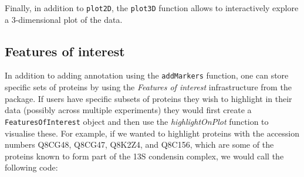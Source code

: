 Finally, in addition to \texttt{plot2D}, the \texttt{plot3D} function
allows to interactively explore a 3-dimensional plot of the data.

\pagebreak

\subsection*{Features of interest}
In addition to adding annotation using the \texttt{addMarkers}
function, one can store specific sets of proteins by using the
\textit{Features of interest} infrastructure from the
 package. If users have specific subsets of proteins
they wish to highlight in their data (possibly across multiple
experiments) they would first create a \texttt{FeaturesOfInterest}
object and then use the \textit{highlightOnPlot} function to
visualise these. For example, if we wanted to highlight
proteins with the accession numbers Q8CG48, Q8CG47, Q8K2Z4, and
Q8C156, which are some of the proteins known to form part of the
13S condensin complex, we would call the following code:


